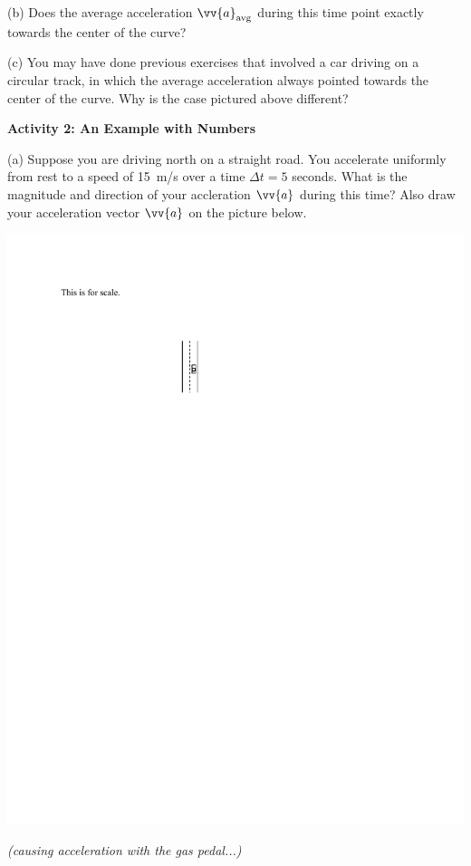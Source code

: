 (b) Does the average acceleration $\vv{a}_{\rm avg}$ during this time point exactly towards the center of the curve?
\answerspace{0.3in}


(c) You may have done previous exercises
that involved a car driving on a circular track, in which the average acceleration always pointed towards the center of the curve.  
Why is the case pictured above different?
\answerspace{0.4in}

\textbf{Activity 2: An Example with Numbers}

(a) Suppose you are driving north on a straight road.  You accelerate uniformly from rest to a speed of 15~m/s over a time $\Delta t = 5$ seconds.  What is the magnitude and direction of your accleration $\vv{a}$ during this time?  Also draw your acceleration vector $\vv{a}$ on the picture below.

\hspace{1.0in}\includegraphics{tangential_and_centripetal_acc/straight.pdf} 
\hspace{0.1in}
\parbox{1.5 in}{\raggedright{\textit{(causing acceleration with the gas pedal...)}}}

